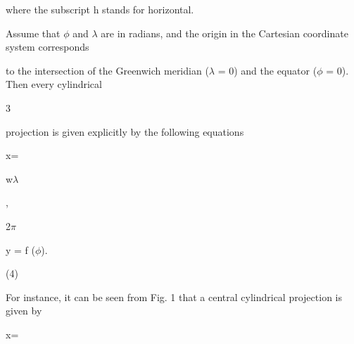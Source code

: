 \documentclass[a4paper,portrait,12pt]{article}
\begin{document}
\begin{flushleft}
where the subscript h stands for horizontal.
\end{flushleft}


\begin{flushleft}
Assume that $\phi$ and $\lambda$ are in radians, and the origin in the Cartesian coordinate system corresponds
\end{flushleft}


\begin{flushleft}
to the intersection of the Greenwich meridian ($\lambda$ = 0) and the equator ($\phi$ = 0). Then every cylindrical
\end{flushleft}


3





\begin{flushleft}
\newpage
projection is given explicitly by the following equations
\end{flushleft}


\begin{flushleft}
x=
\end{flushleft}





\begin{flushleft}
w$\lambda$
\end{flushleft}


,


\begin{flushleft}
2$\pi$
\end{flushleft}





\begin{flushleft}
y = f ($\phi$).
\end{flushleft}





(4)





\begin{flushleft}
For instance, it can be seen from Fig. 1 that a central cylindrical projection is given by
\end{flushleft}


\begin{flushleft}
x=
\end{flushleft}
\end{document}
